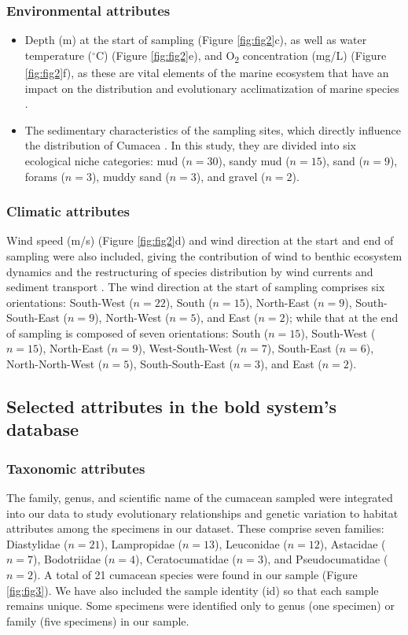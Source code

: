\subsubsection{Environmental attributes} 
\begin{itemize}
\item Depth (m) at the start of sampling (Figure \ref{fig:fig2}c), as well as water temperature ($^\circ$C) (Figure \ref{fig:fig2}e), and O\textsubscript{2} concentration (mg/L) (Figure \ref{fig:fig2}f), as these are vital elements of the marine ecosystem that have an impact on the distribution and evolutionary acclimatization of marine species \citep{rex2006global, danovaro2010first}. 
\item The sedimentary characteristics of the sampling sites, which directly influence the distribution of Cumacea \citep{uhlir_adding_2021}. In this study, they are divided into six ecological niche categories: mud ($n=30$), sandy mud ($n=15$), sand ($n=9$), forams ($n=3$), muddy sand ($n=3$), and gravel ($n=2$).
\end{itemize}

\subsubsection{Climatic attributes} 
Wind speed (m/s) (Figure \ref{fig:fig2}d) and wind direction at the start and end of sampling were also included, giving the contribution of wind to benthic ecosystem dynamics and the restructuring of species distribution by wind currents and sediment transport \citep{siedlecki2016experiments, waga_recent_2020,saeedi_environmental_2022}. The wind direction at the start of sampling comprises six orientations: South-West ($n=22$), South ($n=15$), North-East ($n=9$), South-South-East ($n=9$), North-West ($n=5$), and East ($n=2$); while that at the end of sampling is composed of seven orientations: South ($n=15$), South-West ($n=15$), North-East ($n=9$), West-South-West ($n=7$), South-East ($n=6$), North-North-West ($n=5$), South-South-East ($n=3$), and East ($n=2$). 

\subsection{Selected attributes in the bold system's database}
\subsubsection{Taxonomic attributes} 
The family, genus, and scientific name of the cumacean sampled were integrated into our data to study evolutionary relationships and genetic variation to habitat attributes among the specimens in our dataset. These comprise seven families: Diastylidae ($n=21$), Lampropidae ($n=13$), Leuconidae ($n=12$), Astacidae ($n=7$), Bodotriidae ($n=4$), Ceratocumatidae ($n=3$), and Pseudocumatidae ($n=2$). A total of 21 cumacean species were found in our sample (Figure \ref{fig:fig3}). We have also included the sample identity (id) so that each sample remains unique. Some specimens were identified only to genus (one specimen) or family (five specimens) in our sample.

